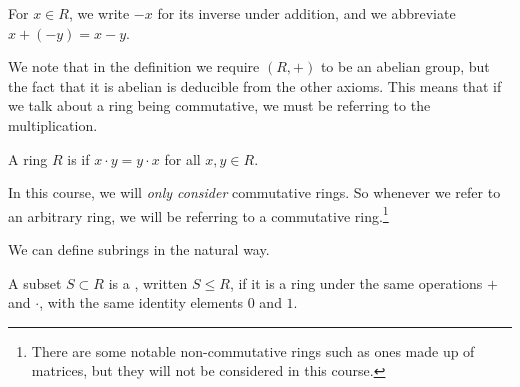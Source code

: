 \documentclass[a4paper]{scrreprt}
\begin{document}
\begin{remark}[Notation]
	For $x \in R$, we write $-x$ for its inverse under addition, and we abbreviate $x + (-y) = x - y$.
\end{remark}

We note that in the definition we require $(R, +)$ to be an abelian group, but the fact that it is abelian is deducible from the other axioms. This means that if we talk about a ring being commutative, we must be referring to the multiplication.

\begin{definition}
	A ring $R$ is  if $x \cdot y = y \cdot x$ for all $x, y \in R$.
\end{definition}

In this course, we will \emph{only consider} commutative rings. So whenever we refer to an arbitrary ring, we will be referring to a commutative ring.\footnote{There are some notable non-commutative rings such as ones made up of matrices, but they will not be considered in this course.}




We can define subrings in the natural way.

\begin{definition}[Subrings]
	A subset $S \subset R$ is a , written $S \leq R$, if it is a ring under the same operations $+$ and $\cdot$, with the same identity elements $0$ and $1$.
 \end{definition}
\end{document}
